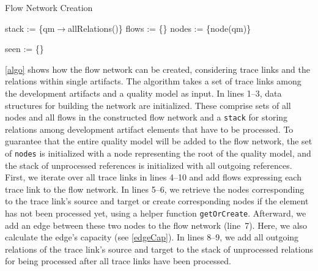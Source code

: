 \begin{algorithm}
        \caption{Flow Network Creation}
        \label{algo}

		\BlankLine
		stack := \{qm$\rightarrow$allRelations()\}\;
		flows := \{\}\;
		nodes := \{node(qm)\}\;
		\BlankLine

		\BlankLine
		seen := \{\}\;
\end{algorithm}

\autoref{algo} shows how the flow network can be created, considering trace links and the relations within single artifacts.
The algorithm takes a set of trace links among the development artifacts and a quality model as input.
In lines 1--3, data structures for building the network are initialized.
These comprise sets of all nodes and all flows in the constructed flow network and a \texttt{stack} for storing relations among development artifact elements that have to be processed.
To guarantee that the entire quality model will be added to the flow network, the set of \texttt{nodes} is initialized with a node representing the root of the quality model, and the stack of unprocessed references is initialized with all outgoing references.
First, we iterate over all trace links in lines 4--10 and add flows expressing each trace link to the flow network.
In lines 5--6, we retrieve the nodes corresponding to the trace link's source and target or create corresponding nodes if the element has not been processed yet, using a helper function \texttt{getOrCreate}.
Afterward, we add an edge between these two nodes to the flow network (line~7).
Here, we also calculate the edge's capacity (see \autoref{edgeCap}).
In lines 8--9, we add all outgoing relations of the trace link's source and target to the stack of unprocessed relations for being processed after all trace links have been processed.

